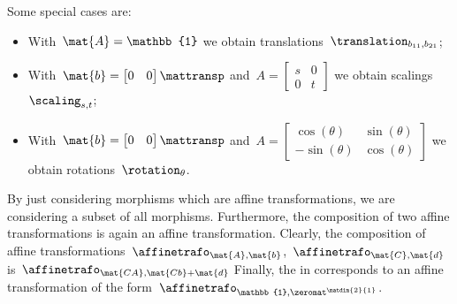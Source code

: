 {\begin{solution}
\begin{itemize}
              Some special cases are:
              \begin{itemize}
                  \item With~$\mat{A}=\mathbb{1}$ we obtain translations~$\translation_{b_{11},b_{21}}$;
                  \item With~$\mat{b}=\begin{bmatrix}
                                0 & 0
                            \end{bmatrix}\mattransp$ and~$A=\begin{bmatrix}
                                s & 0 \\0& t
                            \end{bmatrix}$ we obtain scalings~$\scaling_{s,t}$;
                  \item With~$\mat{b}=\begin{bmatrix}
                                0 & 0
                            \end{bmatrix}\mattransp$ and~$A=\begin{bmatrix}
                                \cos(\theta) & \sin(\theta) \\-\sin(\theta)& \cos(\theta)
                            \end{bmatrix}$ we obtain rotations~$\rotation_{\theta}$.
              \end{itemize}
              By just considering morphisms which are affine transformations, we are considering a subset of all morphisms.
              Furthermore, the composition of two affine transformations is again an affine transformation.
              Clearly, the composition of affine transformations~$\affinetrafo_{\mat{A},\mat{b}}$,~$\affinetrafo_{\mat{C},\mat{d}}$ is~$\affinetrafo_{\mat{CA},\mat{Cb}+\mat{d}}$
              Finally, the  in \Draw corresponds to an affine transformation of the form~$\affinetrafo_{\mathbb{1},\zeromat^{\matdim{2}{1}}}$.
    \end{itemize}
\end{solution}

}